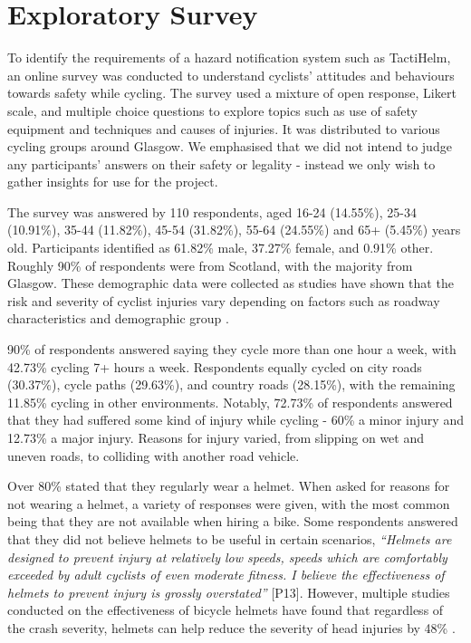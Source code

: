 \documentclass{mpaper}
\begin{document}
\section{Exploratory Survey}\label{sec:survey}
To identify the requirements of a hazard notification system such as TactiHelm, an online survey was conducted to understand cyclists' attitudes and behaviours towards safety while cycling. The survey used a mixture of open response, Likert scale, and multiple choice questions to explore topics such as use of safety equipment and techniques and causes of injuries. It was distributed to various cycling groups around Glasgow. We emphasised that we did not intend to judge any participants' answers on their safety or legality - instead we only wish to gather insights for use for the project.

The survey was answered by 110 respondents, aged 16-24 (14.55\%), 25-34 (10.91\%), 35-44 (11.82\%), 45-54 (31.82\%), 55-64 (24.55\%) and 65+ (5.45\%) years old. Participants identified as 61.82\% male, 37.27\% female, and 0.91\% other. Roughly 90\% of respondents were from Scotland, with the majority from Glasgow. These demographic data were collected as studies have shown that the risk and severity of cyclist injuries vary depending on factors such as roadway characteristics and demographic group \cite{BEHNOOD201735}.

90\% of respondents answered saying they cycle more than one hour a week, with 42.73\% cycling 7+ hours a week. Respondents equally cycled on city roads (30.37\%), cycle paths (29.63\%), and country roads (28.15\%), with the remaining 11.85\% cycling in other environments. Notably, 72.73\% of respondents answered that they had suffered some kind of injury while cycling - 60\% a minor injury and 12.73\% a major injury. Reasons for injury varied, from slipping on wet and uneven roads, to colliding with another road vehicle.

Over 80\% stated that they regularly wear a helmet. When asked for reasons for not wearing a helmet, a variety of responses were given, with the most common being that they are not available when hiring a bike. Some respondents answered that they did not believe helmets to be useful in certain scenarios, \textit{“Helmets are designed to prevent injury at relatively low speeds, speeds which are comfortably exceeded by adult cyclists of even moderate fitness. I believe the effectiveness of helmets to prevent injury is grossly overstated”} [P13]. However, multiple studies conducted on the effectiveness of bicycle helmets \cite{10.1093/ije/dyw153, HOYE201885, HOYE2018239, buth2023effectiveness} have found that regardless of the crash severity, helmets can help reduce the severity of head injuries by 48\% \cite{HOYE201885}.
\end{document}
